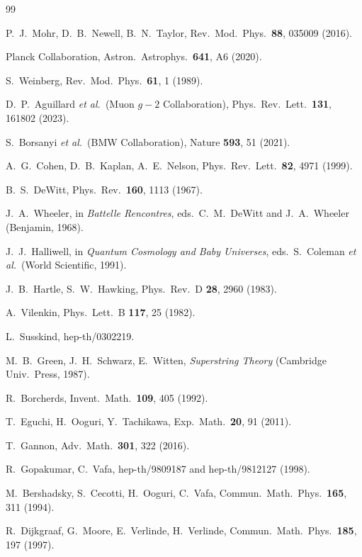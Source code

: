 \documentclass[11pt,a4paper]{article}
\begin{document}
\begin{thebibliography}{99}

P.~J.~Mohr, D.~B.~Newell, B.~N.~Taylor, Rev.\ Mod.\ Phys.\ \textbf{88}, 035009 (2016).

Planck Collaboration, Astron.\ Astrophys.\ \textbf{641}, A6 (2020).

S.~Weinberg, Rev.\ Mod.\ Phys.\ \textbf{61}, 1 (1989).

D.~P.~Aguillard \textit{et al.}\ (Muon $g-2$ Collaboration),
Phys.\ Rev.\ Lett.\ \textbf{131}, 161802 (2023).

S.~Borsanyi \textit{et al.}\ (BMW Collaboration),
Nature \textbf{593}, 51 (2021).

A.~G.~Cohen, D.~B.~Kaplan, A.~E.~Nelson,
Phys.\ Rev.\ Lett.\ \textbf{82}, 4971 (1999).

B.~S.~DeWitt, Phys.\ Rev.\ \textbf{160}, 1113 (1967).

J.~A.~Wheeler, in \textit{Battelle Rencontres},
eds.\ C.~M.~DeWitt and J.~A.~Wheeler (Benjamin, 1968).

J.~J.~Halliwell, in \textit{Quantum Cosmology and Baby Universes},
eds.\ S.~Coleman \textit{et al.}\ (World Scientific, 1991).

J.~B.~Hartle, S.~W.~Hawking, Phys.\ Rev.\ D \textbf{28}, 2960 (1983).

A.~Vilenkin, Phys.\ Lett.\ B \textbf{117}, 25 (1982).

L.~Susskind, hep-th/0302219.

M.~B.~Green, J.~H.~Schwarz, E.~Witten, \textit{Superstring Theory}
(Cambridge Univ.\ Press, 1987).

R.~Borcherds, Invent.\ Math.\ \textbf{109}, 405 (1992).

T.~Eguchi, H.~Ooguri, Y.~Tachikawa, Exp.\ Math.\ \textbf{20}, 91 (2011).

T.~Gannon, Adv.\ Math.\ \textbf{301}, 322 (2016).

R.~Gopakumar, C.~Vafa, hep-th/9809187 and hep-th/9812127 (1998).

M.~Bershadsky, S.~Cecotti, H.~Ooguri, C.~Vafa,
Commun.\ Math.\ Phys.\ \textbf{165}, 311 (1994).

R.~Dijkgraaf, G.~Moore, E.~Verlinde, H.~Verlinde,
Commun.\ Math.\ Phys.\ \textbf{185}, 197 (1997).


\end{thebibliography}
\end{document}
